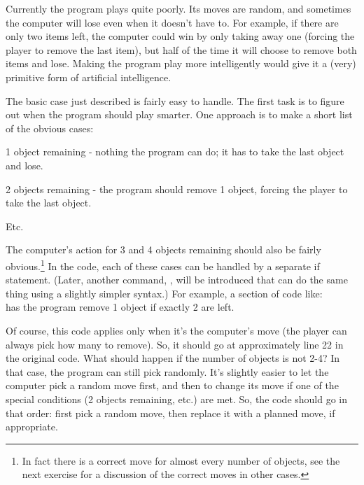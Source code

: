 
Currently the program plays quite poorly.  Its moves are random, and sometimes the computer will lose even when it doesn't have to.  For example, if there are only two items left, the computer could win by only taking away one (forcing the player to remove the last item), but half of the time it will choose to remove both items and lose.  Making the program play more intelligently would give it a (very) primitive form of artificial intelligence.

The basic case just described is fairly easy to handle.  The first task is to figure out when the program should play smarter.  One approach is to make a short list of the obvious cases:
\begin{tight_itemize}
\item 1 object remaining - nothing the program can do; it has to take the last object and lose.
\item 2 objects remaining - the program should remove 1 object, forcing the player to take the last object.
\item Etc.
\end{tight_itemize}
The computer's action for 3 and 4 objects remaining should also be fairly obvious.\footnote{In fact there is a correct move for almost every number of objects, see the next exercise for a discussion of the correct moves in other cases.}
In the code, each of these cases can be handled by a separate if statement.  (Later, another command, , will be introduced that can do the same thing using a slightly simpler syntax.)  For example, a section of code like:\\
has the program remove 1 object if exactly 2 are left.

Of course, this code applies only when it's the computer's move (the player can always pick how many to remove).  So, it should go at approximately line 22 in the original code.  What should happen if the number of objects is not 2-4?  In that case, the program can still pick randomly.   It's slightly easier to let the computer pick a random move first, and then to change its move if one of the special conditions (2 objects remaining, etc.) are met.  So, the code should go in that order: first pick a random move, then replace it with a planned move, if appropriate.

